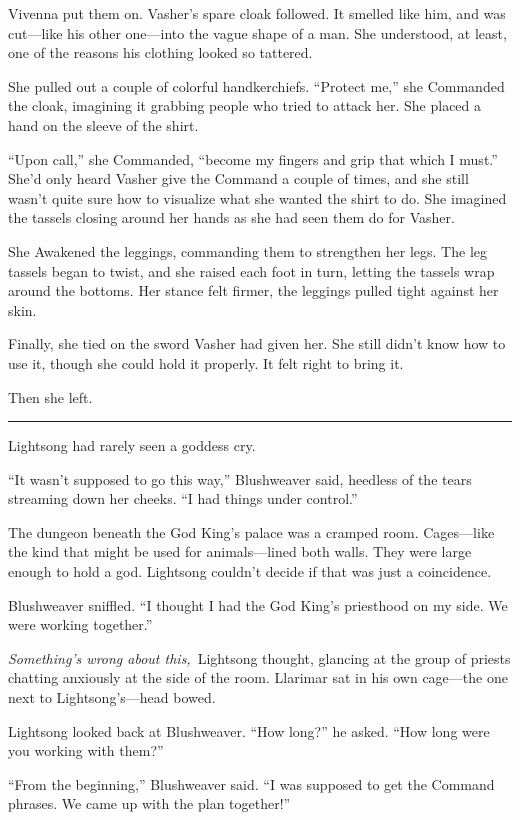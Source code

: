 Vivenna put them on. Vasher’s spare cloak followed. It smelled like him, and was cut—like his other one—into the vague shape of a man. She understood, at least, one of the reasons his clothing looked so tattered.

She pulled out a couple of colorful handkerchiefs. “Protect me,” she Commanded the cloak, imagining it grabbing people who tried to attack her. She placed a hand on the sleeve of the shirt.

“Upon call,” she Commanded, “become my fingers and grip that which I must.” She’d only heard Vasher give the Command a couple of times, and she still wasn’t quite sure how to visualize what she wanted the shirt to do. She imagined the tassels closing around her hands as she had seen them do for Vasher.

She Awakened the leggings, commanding them to strengthen her legs. The leg tassels began to twist, and she raised each foot in turn, letting the tassels wrap around the bottoms. Her stance felt firmer, the leggings pulled tight against her skin.

Finally, she tied on the sword Vasher had given her. She still didn’t know how to use it, though she could hold it properly. It felt right to bring it.

Then she left.

\bigskip \hrule \bigskip

Lightsong had rarely seen a goddess cry.

“It wasn’t supposed to go this way,” Blushweaver said, heedless of the tears streaming down her cheeks. “I had things under control.”

The dungeon beneath the God King’s palace was a cramped room. Cages—like the kind that might be used for animals—lined both walls. They were large enough to hold a god. Lightsong couldn’t decide if that was just a coincidence.

Blushweaver sniffled. “I thought I had the God King’s priesthood on my side. We were working together.”

\textit{Something’s wrong about this,}~Lightsong thought, glancing at the group of priests chatting anxiously at the side of the room. Llarimar sat in his own cage—the one next to Lightsong’s—head bowed.

Lightsong looked back at Blushweaver. “How long?” he asked. “How long were you working with them?”

“From the beginning,” Blushweaver said. “I was supposed to get the Command phrases. We came up with the plan together!”

